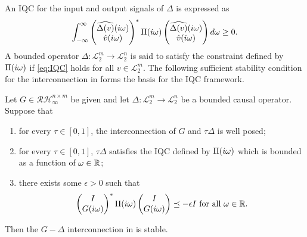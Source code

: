 An IQC for the input and output signals of $\Delta$ is expressed as
\begin{equation}{\displaystyle\ensuremath{\int_{-\infty}^\infty{\begin{pmatrix}\widehat{\Delta(v)}(i\omega)\\\hat{v}(i\omega)\end{pmatrix}^*\Pi(i\omega)\begin{pmatrix}\widehat{\Delta(v)}(i\omega)\\\hat{v}(i\omega)\end{pmatrix}d\omega}}} \geq 0.
\label{eq:IQC}
\end{equation}
A bounded operator $\Delta:\mathcal{L}^m_2\to\mathcal{L}^n_2$ is said to satisfy the constraint defined by $\Pi(i\omega)$ if \eqref{eq:IQC} holds for all $v\in\mathcal{L}^m_2$.
The following sufficient {stability condition for the interconnection in } forms the basis for the IQC framework.
\begin{thm} Let $G\in\mathcal{RH}^{n\times m}_\infty$ be given and let $\Delta:\mathcal{L}^m_2\to\mathcal{L}^n_2$ be a bounded causal operator. Suppose that
\begin{enumerate}
	\item for every $\tau\in[0,1]$, the interconnection of $G$ and $\tau\Delta$ is well posed;
	\item for every $\tau\in[0,1]$, $\tau\Delta$ satisfies the IQC defined by $\Pi(i\omega)$ {which is bounded as a function of $\omega\in\mathbb{R}$;}
	\item there exists some $\epsilon>0$ such that
	\begin{equation}
	\begin{pmatrix}I\\G(i\omega)\end{pmatrix}^*\Pi(i\omega)\begin{pmatrix}I\\G(i\omega)\end{pmatrix} \preceq -\epsilon I\text{\ for all\ }\omega\in\mathbb{\mathbb{R}}.
	\label{eq:IQCthmFDI}
	\end{equation}
\label{IQCthm}
\end{enumerate}
Then the $G-\Delta$ interconnection {in }  is stable.
\end{thm}
